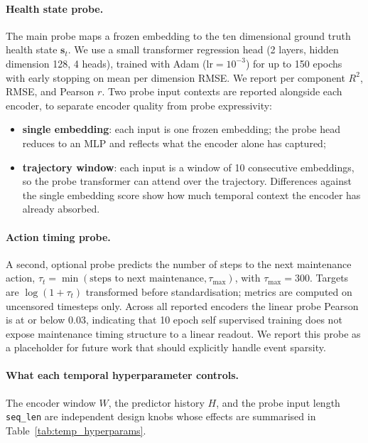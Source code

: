 \paragraph{Health state probe.}
The main probe maps a frozen embedding to the ten dimensional ground
truth health state $\mathbf{s}_t$. We use a small transformer
regression head (2 layers, hidden dimension 128, 4 heads), trained with
Adam ($\text{lr}{=}10^{-3}$) for up to 150 epochs with early stopping
on mean per dimension RMSE. We report per component $R^2$, RMSE, and
Pearson $r$. Two probe input contexts are reported alongside each
encoder, to separate encoder quality from probe expressivity:
\begin{itemize}
  \item \textbf{single embedding}: each input is one frozen embedding;
    the probe head reduces to an MLP and reflects what the encoder
    alone has captured;
  \item \textbf{trajectory window}: each input is a window of 10
    consecutive embeddings, so the probe transformer can attend over
    the trajectory. Differences against the single embedding score show
    how much temporal context the encoder has already absorbed.
\end{itemize}

\paragraph{Action timing probe.}
A second, optional probe predicts the number of steps to the next
maintenance action,
$\tau_t = \min(\text{steps to next maintenance}, \tau_\text{max})$,
with $\tau_\text{max}{=}300$. Targets are $\log(1 + \tau_t)$
transformed before standardisation; metrics are computed on uncensored
timesteps only. Across all reported encoders the linear probe Pearson
is at or below $0.03$, indicating that 10 epoch self supervised
training does not expose maintenance timing structure to a linear
readout. We report this probe as a placeholder for future work that
should explicitly handle event sparsity.

\paragraph{What each temporal hyperparameter controls.}
The encoder window $W$, the predictor history $H$, and the probe input
length \texttt{seq\_len} are independent design knobs whose effects are
summarised in Table~\ref{tab:temp_hyperparams}.

